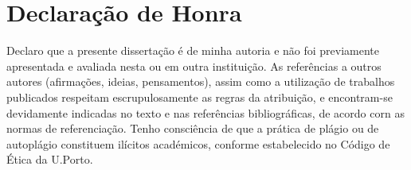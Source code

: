 \chapter*{Declaração de Honra}

Declaro que a presente dissertação é de minha autoria e não foi previamente 
apresentada e avaliada nesta ou em outra instituição. 
As referências a outros autores (afirmações, ideias, pensamentos), 
assim como a utilização de trabalhos publicados respeitam escrupulosamente 
as regras da atribuição, e encontram-se devidamente indicadas no texto e 
nas referências bibliográficas, de acordo corn as normas de referenciação. 
Tenho consciência de que a prática de plágio ou de autoplágio constituem 
ilícitos académicos, conforme estabelecido no Código de Ética da U.Porto.


